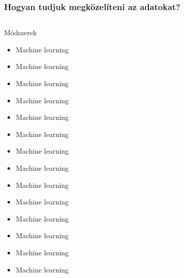 \begin{frame}
\frametitle{Hogyan tudjuk megközelíteni az adatokat?}

\pause

\begin{columns}
\begin{column}{0.45\textwidth}
	\begin{block}{Módszerek}
		\begin{itemize}
			\item Machine learning
			\item Machine learning
			\item Machine learning
			\item Machine learning
			\item Machine learning
			\item Machine learning
			\item Machine learning
			\item Machine learning
			\item Machine learning
			\item Machine learning
			\item Machine learning
			\item Machine learning
			\item Machine learning
			\item Machine learning
		\end{itemize}
	\end{block}
\end{column}
\begin{column}{0.45\textwidth}

\pause


\end{column}
\end{columns}
\end{frame}
